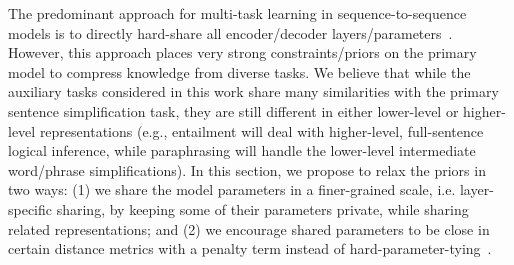 \documentclass[11pt]{article}
\begin{document}
The predominant approach for multi-task learning in sequence-to-sequence models is to directly hard-share all encoder/decoder layers/parameters~\cite{luong2015multi,johnson2016google,pasunuru2017multitask,kaiser2017one}. However, this approach places very strong constraints/priors on the primary model to compress knowledge from diverse tasks. We believe that while the auxiliary tasks considered in this work share many similarities with the primary sentence simplification task, they are still different in either lower-level or higher-level representations (e.g., entailment will deal with higher-level, full-sentence logical inference, while paraphrasing will handle the lower-level intermediate word/phrase simplifications). 
In this section, we propose to relax the priors in two ways: (1) we share the model parameters in a finer-grained scale, i.e. layer-specific sharing, by keeping some of their parameters private, while sharing related representations; and (2) we encourage shared parameters to be close in certain distance metrics with a penalty term instead of hard-parameter-tying~\cite{luong2015multi}.
\end{document}
